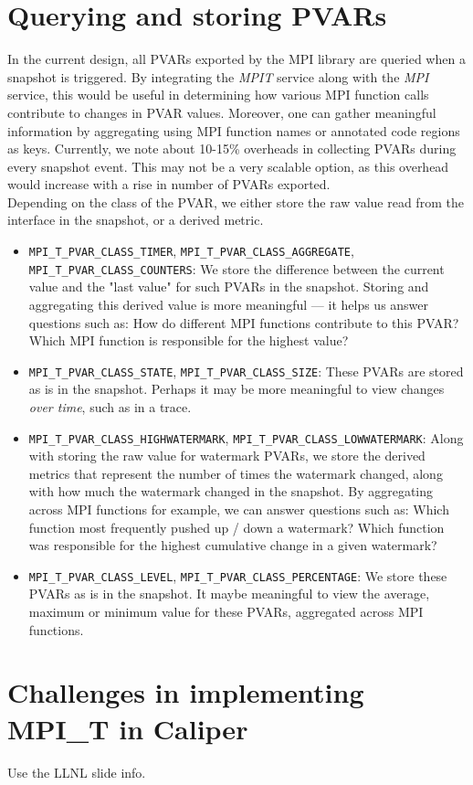 \section{Querying and storing PVARs}
In the current design, all PVARs exported by the MPI library are queried when a snapshot is triggered. By integrating the \emph{MPIT} service along with the \emph{MPI} service, this would be useful in determining how various MPI function calls contribute to changes in PVAR values. Moreover, one can gather meaningful information by aggregating using MPI function names or annotated code regions as keys. Currently, we note about 10-15\% overheads in collecting PVARs during every snapshot event. This may not be a very scalable option, as this overhead would increase with a rise in number of PVARs exported.\\
Depending on the class of the PVAR, we either store the raw value read from the interface in the snapshot, or a derived metric.
\begin{itemize}
	\item \verb+MPI_T_PVAR_CLASS_TIMER+, \verb+MPI_T_PVAR_CLASS_AGGREGATE+, \\\verb+MPI_T_PVAR_CLASS_COUNTERS+: We store the difference between the current value and the "last value" for such PVARs in the snapshot. Storing and aggregating this derived value is more meaningful --- it helps us answer questions such as: How do different MPI functions contribute to this PVAR? Which MPI function is responsible for the highest value?
	\item \verb+MPI_T_PVAR_CLASS_STATE+, \verb+MPI_T_PVAR_CLASS_SIZE+: These PVARs are stored as is in the snapshot. Perhaps it may be more meaningful to view changes \emph{over time}, such as in a trace.
	\item \verb+MPI_T_PVAR_CLASS_HIGHWATERMARK+, \verb+MPI_T_PVAR_CLASS_LOWWATERMARK+: Along with storing the raw value for watermark PVARs, we store the derived metrics that represent the number of times the watermark changed, along with how much the watermark changed in the snapshot. By aggregating across MPI functions for example, we can answer questions such as: Which function most frequently pushed up / down a watermark? Which function was responsible for the highest cumulative change in a given watermark?
	\item \verb+MPI_T_PVAR_CLASS_LEVEL+, \verb+MPI_T_PVAR_CLASS_PERCENTAGE+: We store these PVARs as is in the snapshot. It maybe meaningful to view the average, maximum or minimum value for these PVARs, aggregated across MPI functions.
\end{itemize}

\section {Challenges in implementing MPI\_T in Caliper}
Use the LLNL slide info.


